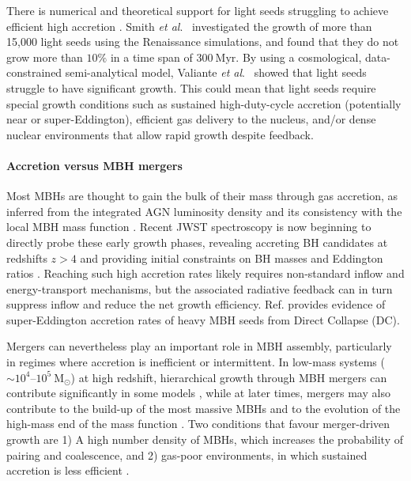 \documentclass[a4paper,12pt]{article}
\begin{document}
There is numerical and theoretical support for light seeds struggling to achieve efficient high accretion \cite{omukai2002upper,oh2003fossil,whalen2004radiation}. Smith \textit{et al}.\ \cite{smith2018growth} investigated the growth of more than 15,000 light seeds using the Renaissance simulations, and found that they do not grow more than $10\%$ in a time span of $300~\mathrm{Myr}$. By using a cosmological, data-constrained semi-analytical model, Valiante \textit{et al}.\ \cite{valiante2016first} showed that light seeds struggle to have significant growth. This could mean that light seeds require special growth conditions such as sustained high-duty-cycle accretion (potentially near or super-Eddington), efficient gas delivery to the nucleus, and/or dense nuclear environments that allow rapid growth despite feedback. 

\paragraph{Accretion versus MBH mergers}
Most MBHs are thought to gain the bulk of their mass through gas accretion, as inferred from the integrated AGN luminosity density and its consistency with the local MBH mass function \cite{soltan1982masses,merloni2008synthesis,inayoshi2020assembly,weinberger2025accretion}. Recent JWST spectroscopy is now beginning to directly probe these early growth phases, revealing accreting BH candidates at redshifts $z>4$ and providing initial constraints on BH masses and Eddington ratios \cite{larson2023ceers,maiolino2024small,harikane2023jwst}.
Reaching such high accretion rates likely requires non-standard inflow and energy-transport mechanisms, but the associated radiative feedback can in turn suppress inflow and reduce the net growth efficiency. Ref.\cite{pacucci2026little} provides evidence of super-Eddington accretion rates of heavy MBH seeds from Direct Collapse (DC).

Mergers can nevertheless play an important role in MBH assembly, particularly in regimes where accretion is inefficient or intermittent. In low-mass systems ($\sim10^{4}$--$10^{5}~\mathrm{M}_{\odot}$) at high redshift, hierarchical growth through MBH mergers can contribute significantly in some models \cite{dayal2019hierarchical,piana2021mass}, while at later times, mergers may also contribute to the build-up of the most massive MBHs and to the evolution of the high-mass end of the mass function \cite{pacucci2020separating}. Two conditions that favour merger-driven growth are 1) A high number density of MBHs, which increases the probability of pairing and coalescence, and 2) gas-poor environments, in which sustained accretion is less efficient \cite{amaro2023astrophysics}.
\end{document}
